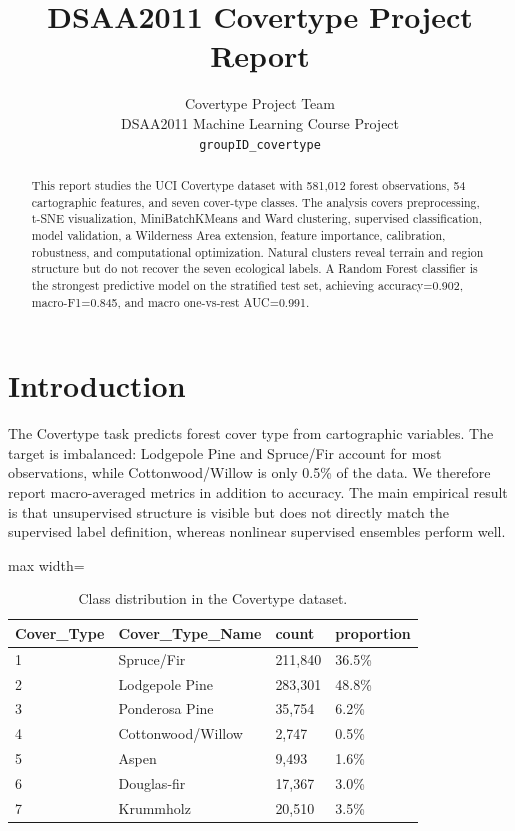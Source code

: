\documentclass{article}
\title{DSAA2011 Covertype Project Report}
\author{%
  Covertype Project Team\\
  DSAA2011 Machine Learning Course Project\\
  \texttt{groupID\_covertype}\\
}
\begin{document}
\maketitle

\begin{abstract}
This report studies the UCI Covertype dataset with 581,012 forest observations, 54 cartographic features, and seven cover-type classes. The analysis covers preprocessing, t-SNE visualization, MiniBatchKMeans and Ward clustering, supervised classification, model validation, a Wilderness Area extension, feature importance, calibration, robustness, and computational optimization. Natural clusters reveal terrain and region structure but do not recover the seven ecological labels. A Random Forest classifier is the strongest predictive model on the stratified test set, achieving accuracy=0.902, macro-F1=0.845, and macro one-vs-rest AUC=0.991.
\end{abstract}

\section{Introduction}
The Covertype task predicts forest cover type from cartographic variables. The target is imbalanced: Lodgepole Pine and Spruce/Fir account for most observations, while Cottonwood/Willow is only 0.5\% of the data. We therefore report macro-averaged metrics in addition to accuracy. The main empirical result is that unsupervised structure is visible but does not directly match the supervised label definition, whereas nonlinear supervised ensembles perform well.

\begin{table}[H]
\centering
\caption{Class distribution in the Covertype dataset.}
\label{tab:target}
\small
\begin{adjustbox}{max width=\linewidth}
\begin{tabular}{llll}
\toprule
Cover\_Type & Cover\_Type\_Name & count & proportion \\
\midrule
1 & Spruce/Fir & 211,840 & 36.5\% \\
2 & Lodgepole Pine & 283,301 & 48.8\% \\
3 & Ponderosa Pine & 35,754 & 6.2\% \\
4 & Cottonwood/Willow & 2,747 & 0.5\% \\
5 & Aspen & 9,493 & 1.6\% \\
6 & Douglas-fir & 17,367 & 3.0\% \\
7 & Krummholz & 20,510 & 3.5\% \\
\bottomrule
\end{tabular}
\end{adjustbox}
\end{table}
\end{document}
